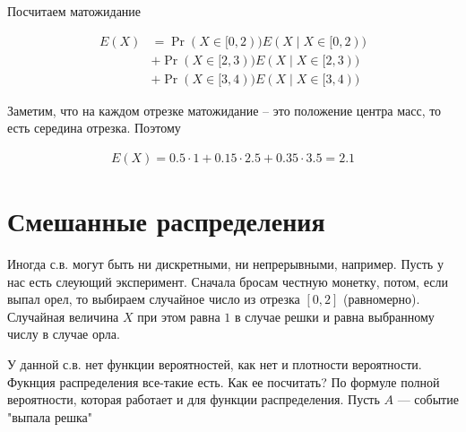 \documentclass[12pt]{article}
\begin{document}
\begin{center}
\end{center}

Посчитаем матожидание

\begin{align*}
  E(X) &= \Pr(X \in [0, 2)) E(X \mid X \in [0, 2)) \\
  &+ \Pr(X \in [2, 3)) E(X \mid X \in [2, 3)) \\
  &+ \Pr(X \in [3, 4)) E(X \mid X \in [3, 4)) 
\end{align*}

Заметим, что на каждом отрезке матожидание -- это положение центра масс, то есть середина отрезка. Поэтому


\begin{align*}
  E(X) = 0.5 \cdot 1 + 0.15 \cdot 2.5 + 0.35 \cdot 3.5 = 2.1
\end{align*}

\section{Смешанные распределения}

Иногда с.в. могут быть ни дискретными, ни непрерывными, например. Пусть у нас есть слеующий эксперимент. Сначала бросам честную монетку, потом, если выпал орел, то выбираем случайное число из отрезка $[0,2]$ (равномерно). Случайная величина $X$ при этом равна $1$ в случае решки и равна выбранному числу в случае орла.

У данной с.в. нет функции вероятностей, как нет и плотности вероятности. Фукнция распределения все-такие есть. Как ее посчитать? По формуле полной вероятности, которая работает и для функции распределения. Пусть $A$ --- событие "выпала решка"
\end{document}
